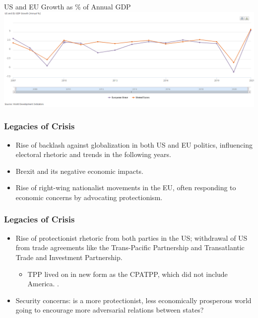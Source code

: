 \documentclass[handout]{beamer}
\begin{document}
\begin{frame}{\LARGE US and EU Growth as \% of Annual GDP}
	\centering
	\includegraphics[width=\textwidth,height=\textheight,keepaspectratio]{WDIgdp.png}
\end{frame}

\begin{frame} 
	\frametitle{\LARGE{Legacies of Crisis}}
	\begin{itemize}
		\item Rise of backlash against globalization in both US and EU politics, influencing  electoral rhetoric and trends in the following years. 
		\item Brexit and its negative economic impacts.
		\item Rise of right-wing nationalist movements in the EU, often responding to economic concerns by advocating protectionism.	
	\end{itemize}
\end{frame}

\begin{frame} 
	\frametitle{\LARGE{Legacies of Crisis}}
	\begin{itemize}
		\item Rise of protectionist rhetoric from both parties in the US; withdrawal of US from trade agreements like the Trans-Pacific Partnership and Transatlantic Trade and Investment Partnership.
		\begin{itemize}
			\item TPP lived on in new form as the CPATPP, which did not include America. \pause.
		\end{itemize}
		\item Security concerns: is a more protectionist, less economically prosperous world going to encourage more adversarial relations between states?	
	\end{itemize}
\end{frame}
\end{document}
